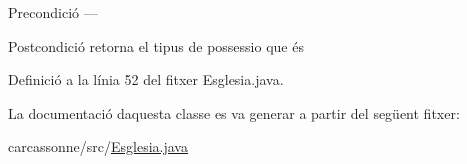 \begin{DoxyPrecond}{Precondició}
--- 
\end{DoxyPrecond}
\begin{DoxyPostcond}{Postcondició}
retorna el tipus de possessio que és 
\end{DoxyPostcond}


Definició a la línia 52 del fitxer Esglesia.\+java.



La documentació d\textquotesingle{}aquesta classe es va generar a partir del següent fitxer\+:\begin{DoxyCompactItemize}
\item 
carcassonne/src/\mbox{\hyperlink{_esglesia_8java}{Esglesia.\+java}}\end{DoxyCompactItemize}
